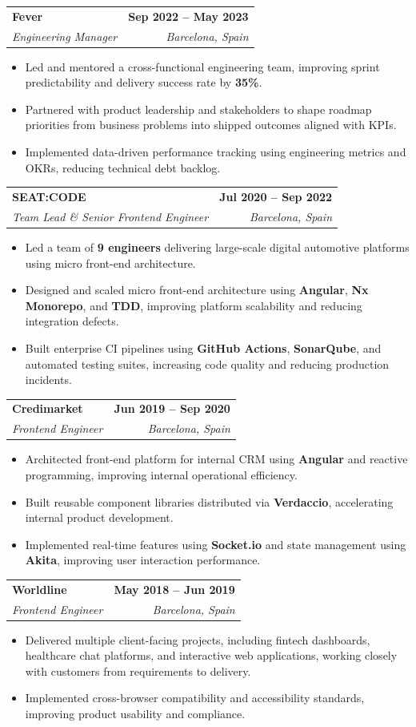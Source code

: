 \documentclass[letterpaper,11pt]{article}
\makeatletter
\newcommand{\resumeItem}[1]{
  \item\small{{#1 \vspace{-2pt}}}
}
\newcommand{\resumeSubheading}[4]{
  \vspace{-2pt}\item
    \begin{tabular*}{1.0\textwidth}[t]{l@{\extracolsep{\fill}}r}
      \textbf{#1} & \textbf{\small #2} \\
      \textit{\small#3} & \textit{\small #4} \\
    \end{tabular*}\vspace{-7pt}
}
\newcommand{\resumeItemListStart}{\begin{itemize}}
\newcommand{\resumeItemListEnd}{\end{itemize}\vspace{-5pt}}
\makeatother
\begin{document}
    \resumeSubheading
      {Fever}{Sep 2022 -- May 2023}
      {Engineering Manager}{Barcelona, Spain}
      \resumeItemListStart
        \resumeItem{Led and mentored a cross-functional engineering team, improving sprint predictability and delivery success rate by \textbf{35\%}.}
        \resumeItem{Partnered with product leadership and stakeholders to shape roadmap priorities from business problems into shipped outcomes aligned with KPIs.}
        \resumeItem{Implemented data-driven performance tracking using engineering metrics and OKRs, reducing technical debt backlog.}
      \resumeItemListEnd
    \vspace{6pt}

    \resumeSubheading
      {SEAT:CODE}{Jul 2020 -- Sep 2022}
      {Team Lead \& Senior Frontend Engineer}{Barcelona, Spain}
      \resumeItemListStart
        \resumeItem{Led a team of \textbf{9 engineers} delivering large-scale digital automotive platforms using micro front-end architecture.}
        \resumeItem{Designed and scaled micro front-end architecture using \textbf{Angular}, \textbf{Nx Monorepo}, and \textbf{TDD}, improving platform scalability and reducing integration defects.}
        \resumeItem{Built enterprise CI pipelines using \textbf{GitHub Actions}, \textbf{SonarQube}, and automated testing suites, increasing code quality and reducing production incidents.}
      \resumeItemListEnd
    \vspace{6pt}

    \pagebreak
    
    \resumeSubheading
      {Credimarket}{Jun 2019 -- Sep 2020}
      {Frontend Engineer}{Barcelona, Spain}
      \resumeItemListStart
        \resumeItem{Architected front-end platform for internal CRM using \textbf{Angular} and reactive programming, improving internal operational efficiency.}
        \resumeItem{Built reusable component libraries distributed via \textbf{Verdaccio}, accelerating internal product development.}
        \resumeItem{Implemented real-time features using \textbf{Socket.io} and state management using \textbf{Akita}, improving user interaction performance.}
      \resumeItemListEnd
    \vspace{6pt}

    \resumeSubheading
      {Worldline}{May 2018 -- Jun 2019}
      {Frontend Engineer}{Barcelona, Spain}
      \resumeItemListStart
        \resumeItem{Delivered multiple client-facing projects, including fintech dashboards, healthcare chat platforms, and interactive web applications, working closely with customers from requirements to delivery.}
        \resumeItem{Implemented cross-browser compatibility and accessibility standards, improving product usability and compliance.}
      \resumeItemListEnd
    \vspace{6pt}
\end{document}
